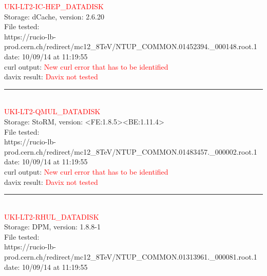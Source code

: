 \textcolor{red}{\normalsize{UKI-LT2-IC-HEP\_DATADISK}}\\

Storage: dCache, version: 2.6.20\\

File tested:\\
\footnotesize{https://rucio-lb-prod.cern.ch/redirect/mc12\_8TeV/NTUP\_COMMON.01452394.\_000148.root.1}\\

date: 10/09/14 at 11:19:55\\

curl output:  \textcolor{red}{New curl error that has to be identified}\\

davix result:  \textcolor{red}{Davix not tested}\\

\rule{\textwidth}{1pt}\\

\textcolor{red}{\normalsize{UKI-LT2-QMUL\_DATADISK}}\\

Storage: StoRM, version: <FE:1.8.5><BE:1.11.4>\\

File tested:\\
\footnotesize{https://rucio-lb-prod.cern.ch/redirect/mc12\_8TeV/NTUP\_COMMON.01483457.\_000002.root.1}\\

date: 10/09/14 at 11:19:55\\

curl output:  \textcolor{red}{New curl error that has to be identified}\\

davix result:  \textcolor{red}{Davix not tested}\\

\rule{\textwidth}{1pt}\\

\textcolor{red}{\normalsize{UKI-LT2-RHUL\_DATADISK}}\\

Storage: DPM, version: 1.8.8-1\\

File tested:\\
\footnotesize{https://rucio-lb-prod.cern.ch/redirect/mc12\_8TeV/NTUP\_COMMON.01313961.\_000081.root.1}\\

date: 10/09/14 at 11:19:55\\

